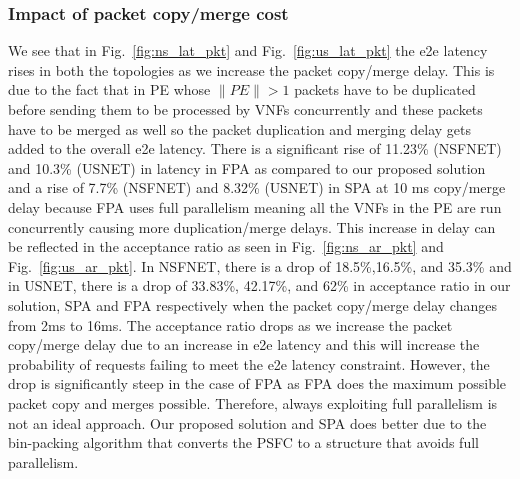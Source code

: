 \documentclass[journal]{IEEEtran}
\begin{document}
\subsubsection{Impact of packet copy/merge cost}
We see that in Fig.~\ref{fig:ns_lat_pkt} and Fig.~\ref{fig:us_lat_pkt} the e2e latency rises in both the topologies as we increase the packet copy/merge delay. This is due to the fact that in PE whose $\lVert PE \rVert > 1$ packets have to be duplicated before sending them to be processed by VNFs concurrently and these packets have to be merged as well so the packet duplication and merging delay gets added to the overall e2e latency. There is a significant rise of 11.23\% (NSFNET) and 10.3\% (USNET) in latency in FPA as compared to our proposed solution and a rise of 7.7\% (NSFNET) and 8.32\% (USNET) in SPA at 10 ms copy/merge delay because FPA uses full parallelism meaning all the VNFs in the PE are run concurrently causing more duplication/merge delays. This increase in delay can be reflected in the acceptance ratio as seen in Fig.~\ref{fig:ns_ar_pkt} and Fig.~\ref{fig:us_ar_pkt}. In NSFNET, there is a drop of 18.5\%,16.5\%, and 35.3\% and in USNET, there is a drop of 33.83\%, 42.17\%, and 62\% in acceptance ratio in our solution, SPA and FPA respectively when the packet copy/merge delay changes from 2ms to 16ms. The acceptance ratio drops as we increase the packet copy/merge delay due to an increase in e2e latency and this will increase the probability of requests failing to meet the e2e latency constraint. However, the drop is significantly steep in the case of FPA as FPA does the maximum possible packet copy and merges possible. Therefore, always exploiting full parallelism is not an ideal approach. Our proposed solution and SPA does better due to the bin-packing algorithm that converts the PSFC to a structure that avoids full parallelism.
\end{document}
